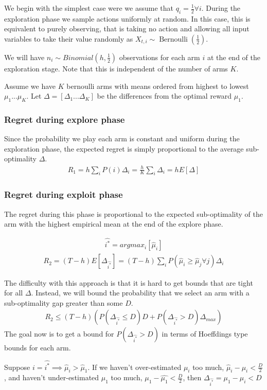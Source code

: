 \documentclass{article}
\newcommand{\eqn}[1]{\begin{align}#1\end{align}}
\newcommand{\Ber}{\operatorname{Bernoulli}}
\theoremstyle{plain}
\theoremstyle{definition}
\begin{document}
We begin with the simplest case were we assume that $q_i=\frac{1}{2} \forall i$. During the exploration phase we sample actions uniformly at random. In this case, this is equivalent to purely observing, that is taking no action and allowing all input variables to take their value randomly as  $X_{t,i} \sim \Ber(\frac{1}{2})$. 



We will have $n_i \sim Binomial(h,\frac{1}{2})$ observations for each arm $i$ at the end of the exploration stage. Note that this is independent of the number of arms $K$.



Assume we have $K$ bernoulli arms with means ordered from highest to lowest $\mu_1 ... \mu_K$. Let $\Delta = [\Delta_1...\Delta_K]$ be the differences from the optimal reward $\mu_1$. 



 

\subsubsection*{Regret during explore phase}
Since the probability we play each arm is constant and uniform during the exploration phase, the expected regret is simply proportional to the average sub-optimality $\Delta$.
\eqn{
R_1 = h\sum_i P(i)\Delta_i = \frac{h}{K}\sum_i \Delta_i = h E[\Delta]
}

\subsubsection*{Regret during exploit phase}
The regret during this phase is proportional to the expected sub-optimality of the arm with the highest empirical mean at the end of the explore phase.

\eqn{
\hat{i^*} = argmax_i [\hat{\mu}_i]
}
\eqn{
R_2 = (T-h)E[\Delta_{\hat{i^*}}] = (T-h)\sum_i P(\hat{\mu}_i \geq \hat{\mu}_j \forall j)\Delta_i 
}

The difficulty with this approach is that it is hard to get bounds that are tight for all $\Delta$. Instead, we will bound the probability that we select an arm with a sub-optimality gap greater than some $D$.
\eqn{
R_2 \leq (T-h)\left(P(\Delta_{\hat{i^*}} \leq D) D+P(\Delta_{\hat{i^*}} > D)  \Delta_{max} \right)
}
The goal now is to get a bound for $P(\Delta_{\hat{i^*}} > D)$ in terms of Hoeffdings type bounds for each arm. 

Suppose $i = \hat{i^*} \implies \hat{\mu}_i > \hat{\mu}_1$. If we haven't over-estimated $\mu_i$ too much, $\hat{\mu}_i - \mu_{i} < \frac{D}{2}$, and haven't under-estimated $\mu_1$ too much, $\mu_1 - \hat{\mu_1} < \frac{D}{2}$, then $\Delta_{\hat{i^*}} = \mu_1 - \mu_i < D$
\end{document}
